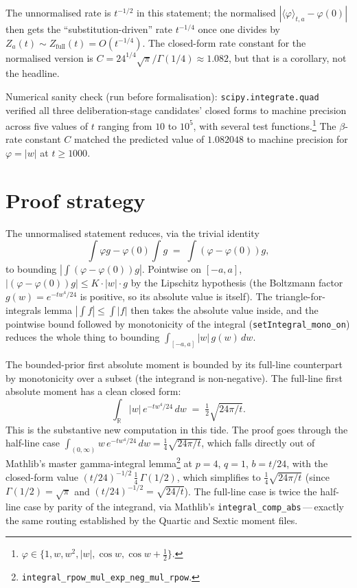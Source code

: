 \documentclass[11pt]{article}
\begin{document}
The unnormalised rate is $t^{-1/2}$ in this statement; the normalised
$|\langle\varphi\rangle_{t,a} - \varphi(0)|$ then gets the
``substitution-driven'' rate $t^{-1/4}$ once one divides by
$Z_a(t) \sim Z_{\text{full}}(t) = O(t^{-1/4})$. The closed-form rate
constant for the normalised version is
$C = 24^{1/4}\sqrt{\pi}/\Gamma(1/4) \approx 1.082$, but that is a corollary,
not the headline.

Numerical sanity check (run before formalisation):
\texttt{scipy.integrate.quad} verified all three deliberation-stage
candidates' closed forms to machine precision across five values of $t$
ranging from $10$ to $10^5$, with several test
functions.\footnote{$\varphi \in \{1, w, w^2, |w|, \cos w, \cos w +
\tfrac{1}{2}\}$.} The $\beta$-rate constant $C$ matched the predicted
value of $1.082048$ to machine precision for $\varphi = |w|$ at
$t \ge 1000$.

\section{Proof strategy}

The unnormalised statement reduces, via the trivial identity
\[
  \int \varphi g - \varphi(0) \int g \;=\; \int (\varphi - \varphi(0)) g,
\]
to bounding $|\int (\varphi - \varphi(0)) g|$. Pointwise on $[-a, a]$,
$|(\varphi - \varphi(0)) g| \le K \cdot |w| \cdot g$ by the Lipschitz
hypothesis (the Boltzmann factor $g(w) = e^{-tw^4/24}$ is positive, so its
absolute value is itself). The triangle-for-integrals lemma
$|\int f| \le \int |f|$ then takes the absolute value inside, and the
pointwise bound followed by monotonicity of the integral
(\texttt{setIntegral\_mono\_on}) reduces the whole thing to bounding
$\int_{[-a,a]} |w|\,g(w)\,dw$.

The bounded-prior first absolute moment is bounded by its full-line
counterpart by monotonicity over a subset (the integrand is
non-negative). The full-line first absolute moment has a clean closed
form:
\[
  \int_{\mathbb{R}} |w|\,e^{-tw^4/24}\,dw \;=\; \tfrac{1}{2}\sqrt{24\pi/t}.
\]
This is the substantive new computation in this tide. The proof goes
through the half-line case
$\int_{(0,\infty)} w\,e^{-tw^4/24}\,dw = \tfrac{1}{4}\sqrt{24\pi/t}$, which
falls directly out of Mathlib's master gamma-integral
lemma\footnote{\texttt{integral\_rpow\_mul\_exp\_neg\_mul\_rpow}.} at
$p = 4$, $q = 1$, $b = t/24$, with the closed-form value
$(t/24)^{-1/2}\,\tfrac{1}{4}\,\Gamma(1/2)$, which simplifies to
$\tfrac{1}{4}\sqrt{24\pi/t}$ (since $\Gamma(1/2) = \sqrt{\pi}$ and
$(t/24)^{-1/2} = \sqrt{24/t}$). The full-line case is twice the half-line
case by parity of the integrand, via Mathlib's
\texttt{integral\_comp\_abs}\,---\,exactly the same routing established by
the Quartic and Sextic moment files.
\end{document}
